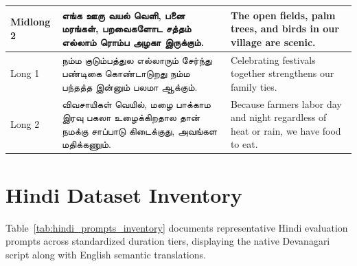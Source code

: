 \begin{table}[htbp]
{\begin{tabular}{l>{\tamilfont\raggedright\arraybackslash}p{8.5cm}>{\raggedright\arraybackslash}p{7.0cm}}
Midlong 2 & எங்க ஊரு வயல் வெளி, பனை மரங்கள், பறவைகளோட சத்தம் எல்லாம் ரொம்ப அழகா இருக்கும். & The open fields, palm trees, and birds in our village are scenic. \\
\midrule
Long 1 & நம்ம குடும்பத்துல எல்லாரும் சேர்ந்து பண்டிகை கொண்டாடுறது நம்ம பந்தத்த இன்னும் பலமா ஆக்கும். & Celebrating festivals together strengthens our family ties. \\
Long 2 & விவசாயிகள் வெயில், மழை பாக்காம இரவு பகலா உழைக்கிறதால தான் நமக்கு சாப்பாடு கிடைக்குது, அவங்கள மதிக்கணும். & Because farmers labor day and night regardless of heat or rain, we have food to eat. \\
\bottomrule
\end{tabular}%
}
\end{table}

\section{Hindi Dataset Inventory}
Table~\ref{tab:hindi_prompts_inventory} documents representative Hindi evaluation prompts across standardized duration tiers, displaying the native Devanagari script along with English semantic translations.

